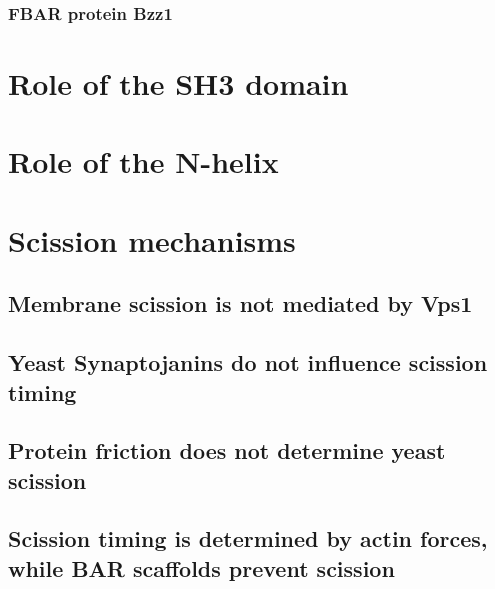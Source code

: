		\subsubsection{FBAR protein Bzz1}
		
		
\section{Role of the SH3 domain}		
\section{Role of the N-helix}			
		
\section{Scission mechanisms}

	\subsection{Membrane scission is not mediated by Vps1}
	\subsection{Yeast Synaptojanins do not influence scission timing}
	\subsection{Protein friction does not determine yeast scission }
	\subsection{Scission timing is determined by actin forces, while BAR scaffolds prevent scission}